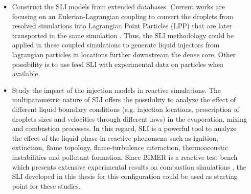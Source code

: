 \begin{itemize}
	\item Construct the SLI models from extended databases. Current works are focusing on an Eulerian-Lagrangian coupling to convert the droplets from resolved simulations into Lagrangian Point Particles (LPP) that are later transported in the same simulation . Thus, the SLI methodology could be applied in these coupled simulations to generate liquid injectors from lagrangian particles in locations further downstream the dense core. Other possibility is to use feed SLI with experimental data on particles when available.  
	
	\item Study the impact of the injection models in reactive simulations. The multiparametric nature of SLI offers the possibility to analyze the effect of different liquid boundary conditions (e.g. injection locations, prescription of droplets sizes and velocities through different laws) in the evaporation, mixing and combustion processes. In this regard, SLI is a powerful tool to analyze the effect of the liquid phase in reactive phenomena such as ignition, extinction, flame topology, flame-turbulence interaction, thermoacoustic instabilities and pollutant formation. Since BIMER is a reactive test bench which presents extensive experimental results on combustion simulations , the SLI developed in this thesis for this configuration could be used as starting point for these studies.
	



\end{itemize}

